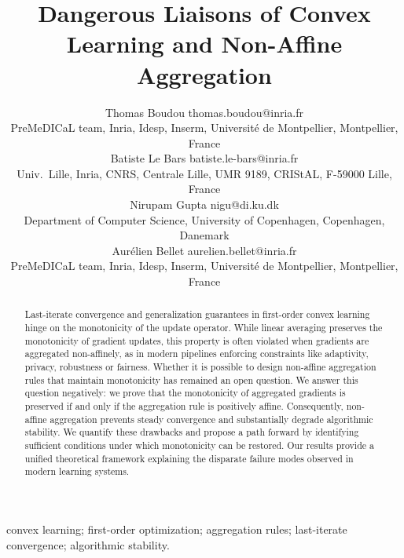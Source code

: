 \documentclass[twoside,11pt]{article}
\begin{document}
\title{Dangerous Liaisons of Convex Learning and Non-Affine Aggregation}

\author{\!
  \name Thomas Boudou 
  \email thomas.boudou@inria.fr \\
  \addr PreMeDICaL team, Inria, Idesp, Inserm, Université de Montpellier, Montpellier, France\\
  \AND
  \name Batiste Le Bars 
  \email batiste.le-bars@inria.fr \\
  \addr Univ.\ Lille, Inria, CNRS, Centrale Lille, UMR 9189, CRIStAL, F-59000 Lille, France\\
  \AND
  \name Nirupam Gupta 
  \email nigu@di.ku.dk \\
  \addr Department of Computer Science, University of Copenhagen, Copenhagen, Danemark\\
  \AND
  \name Aurélien Bellet 
  \email aurelien.bellet@inria.fr \\
  \addr PreMeDICaL team, Inria, Idesp, Inserm, Université de Montpellier, Montpellier, France
}


\maketitle

\begin{abstract}%
  Last-iterate convergence and generalization guarantees in first-order convex learning hinge on the monotonicity of the update operator.
  While linear averaging preserves the monotonicity of gradient updates, this property is often violated when gradients are aggregated non-affinely, as in modern pipelines enforcing constraints like adaptivity, privacy, robustness or fairness. 
  Whether it is possible to design non-affine aggregation rules that maintain monotonicity has remained an open question.
  We answer this question negatively: we prove that the monotonicity of aggregated gradients is preserved if and only if the aggregation rule is positively affine. 
  Consequently, non-affine aggregation prevents steady convergence and substantially degrade algorithmic stability. 
  We quantify these drawbacks and propose a path forward by identifying sufficient conditions under which monotonicity can be restored.
  Our results provide a unified theoretical framework explaining the disparate failure modes observed in modern learning systems.
\end{abstract}
\begin{keywords}%
  convex learning; first-order optimization; aggregation rules; last-iterate convergence; algorithmic stability.%
\end{keywords}
\end{document}
